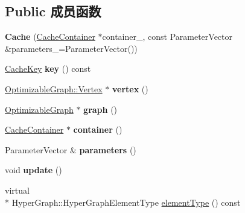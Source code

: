 \subsection*{Public 成员函数}
\begin{DoxyCompactItemize}
\item 
\hypertarget{classg2o_1_1Cache_adb5e57e9f06505511fdedb247a977cc3}{{\bfseries Cache} (\hyperlink{classg2o_1_1CacheContainer}{Cache\-Container} $\ast$container\-\_, const Parameter\-Vector \&parameters\-\_\-=Parameter\-Vector())}\label{classg2o_1_1Cache_adb5e57e9f06505511fdedb247a977cc3}

\item 
\hypertarget{classg2o_1_1Cache_a12c78ed261c8659c2539b6ebe52aea8f}{\hyperlink{classg2o_1_1Cache_1_1CacheKey}{Cache\-Key} {\bfseries key} () const }\label{classg2o_1_1Cache_a12c78ed261c8659c2539b6ebe52aea8f}

\item 
\hypertarget{classg2o_1_1Cache_ab94788e39d7e81201d14bc8ac58325c7}{\hyperlink{classg2o_1_1OptimizableGraph_1_1Vertex}{Optimizable\-Graph\-::\-Vertex} $\ast$ {\bfseries vertex} ()}\label{classg2o_1_1Cache_ab94788e39d7e81201d14bc8ac58325c7}

\item 
\hypertarget{classg2o_1_1Cache_a1a4480a445469d2d02b8db449e6cb57c}{\hyperlink{structg2o_1_1OptimizableGraph}{Optimizable\-Graph} $\ast$ {\bfseries graph} ()}\label{classg2o_1_1Cache_a1a4480a445469d2d02b8db449e6cb57c}

\item 
\hypertarget{classg2o_1_1Cache_a249ffa5c8ac120b3123bd151200082c9}{\hyperlink{classg2o_1_1CacheContainer}{Cache\-Container} $\ast$ {\bfseries container} ()}\label{classg2o_1_1Cache_a249ffa5c8ac120b3123bd151200082c9}

\item 
\hypertarget{classg2o_1_1Cache_a16e471be92f9fe24a3abdf11a0c546d2}{Parameter\-Vector \& {\bfseries parameters} ()}\label{classg2o_1_1Cache_a16e471be92f9fe24a3abdf11a0c546d2}

\item 
\hypertarget{classg2o_1_1Cache_aaea446a5eb59569acc67c94793975a0b}{void {\bfseries update} ()}\label{classg2o_1_1Cache_aaea446a5eb59569acc67c94793975a0b}

\item 
virtual \\*
Hyper\-Graph\-::\-Hyper\-Graph\-Element\-Type \hyperlink{classg2o_1_1Cache_a975c586e5a84dd3f4a85f364d5f92f91}{element\-Type} () const 
\end{DoxyCompactItemize}
